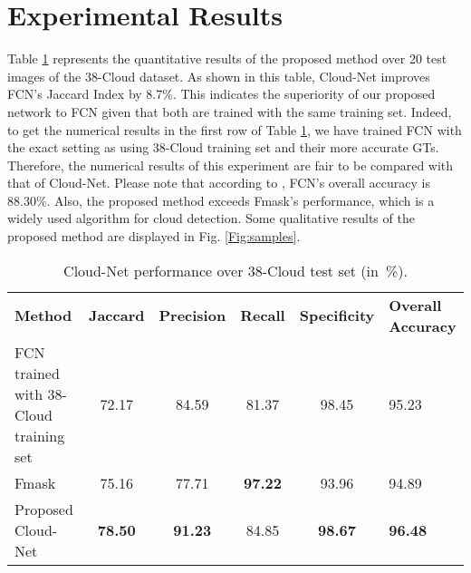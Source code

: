 \documentclass{article}
\begin{document}
\section{Experimental Results}
Table \ref{Tab:numerical} represents the quantitative results of the proposed method over 20 test images of the 38-Cloud dataset. As shown in this table, Cloud-Net improves FCN's Jaccard Index by 8.7\%. This indicates the superiority of our proposed network to FCN given that both are trained with the same training set. Indeed, to get the numerical results in the first row of Table \ref{Tab:numerical}, we have trained FCN with the exact setting as \cite{mymmsp} using 38-Cloud training set and their more accurate GTs. Therefore, the numerical results of this experiment are fair to be compared with that of Cloud-Net. Please note that according to \cite{mymmsp}, FCN's overall accuracy is 88.30\%. Also, the proposed method exceeds Fmask's performance, which is a widely used algorithm for cloud detection. Some qualitative results of the proposed method are displayed in Fig. \ref{Fig:samples}.



\renewcommand{\tabcolsep}{3pt}
\vspace{-4mm}
\begin{table}[h]
\small
\begin{minipage}[t]{0.49\textwidth}
\centering
\caption{Cloud-Net performance over 38-Cloud test set (in~\%).
\vspace{-2mm}
\label{Tab:numerical}} \begin{tabular}{|m{17mm}|c|c|c|c|m{13mm}|}
\hline
\centering \textbf{Method}   & \textbf{Jaccard}                       & \textbf{Precision}   & \textbf{Recall} & \textbf{Specificity} & \textbf{Overall Accuracy}   \\ 
\hhline{|=|=|=|=|=|=|}
FCN \cite{mymmsp} trained with 38-Cloud training set & 72.17 & 84.59
  & 81.37 &   98.45  & \hspace{2mm} 95.23 \\ \hline
Fmask \cite{fmask2}    & 75.16  & 77.71 & \textbf{97.22} &  93.96 & \hspace{2mm} 94.89 \\ \hline
Proposed Cloud-Net  & \textbf{78.50} &  \textbf{91.23}&  84.85  & \textbf{98.67} & \hspace{2mm} \textbf{96.48}
\\ \hline
\end{tabular}
\end{minipage}
\vspace{-5mm}
\end{table}
\end{document}

